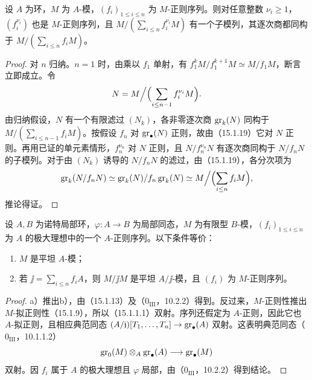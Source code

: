 设 $A$ 为环，$M$ 为 $A$-模，$(f_i)_{1\leq i\leq n}$ 为 $M$-正则序列。则对任意整数 $\nu_i\geq1$，$(f_i^{\nu_i})$ 也是 $M$-正则序列，且
$M/(\sum_{i\leq n}f_i^{\nu_i}M)$ 有一个子模列，其逐次商都同构于 $M/(\sum_{i\leq n}f_iM)$。
\begin{proof}
对 $n$ 归纳。$n=1$ 时，由乘以 $f_1$ 单射，有 $f_1^kM/f_1^{k+1}M\simeq M/f_1M$，断言立即成立。令
\[
 N=M\Big/\Bigl(\sum_{i\leq n-1}f_i^{\nu_i}M\Bigr).
\]
由归纳假设，$N$ 有一个有限滤过 $(N_k)$，各非零逐次商 $\operatorname{gr}_k(N)$ 同构于 $M/(\sum_{i\leq n-1}f_iM)$。按假设 $f_n$ 对 $\operatorname{gr}_\bullet(N)$ 正则，故由（15.1.19）它对 $N$ 正则。再用已证的单元素情形，$f_n^{\nu_n}$ 对 $N$ 正则，且 $N/f_n^{\nu_n}N$ 有逐次商同构于 $N/f_nN$ 的子模列。对于由 $(N_k)$ 诱导的 $N/f_nN$ 的滤过，由（15.1.19），各分次项为
\[
 \operatorname{gr}_k(N/f_nN)\simeq\operatorname{gr}_k(N)/f_n\operatorname{gr}_k(N)
 \simeq M\Big/\Bigl(\sum_{i\leq n}f_iM\Bigr),
\]
推论得证。
\end{proof}

设 $A,B$ 为诺特局部环，$\varphi:A\to B$ 为局部同态，$M$ 为有限型 $B$-模，$(f_i)_{1\leq i\leq n}$ 为 $A$ 的极大理想中的一个 $A$-正则序列。以下条件等价：
\begin{enumerate}[label=\alph*)]
\item $M$ 是平坦 $A$-模；
\item 若 $\jj=\sum_{i\leq n}f_iA$，则 $M/\jj M$ 是平坦 $A/\jj$-模，且 $(f_i)$ 为 $M$-正则序列。
\end{enumerate}
\begin{proof}
a）推出b），由（15.1.13）及（$0_{\mathrm{III}}$，10.2.2）得到。反过来，$M$-正则性推出 $M$-拟正则性（15.1.9），所以（15.1.1.1）双射。序列还假定为 $A$-正则，因此它也 $A$-拟正则，且相应典范同态
$(A/\mathfrak j)[T_1,\ldots,T_n]\to\operatorname{gr}_\bullet(A)$ 双射。这表明典范同态（$0_{\mathrm{III}}$，10.1.1.2）
\[
 \operatorname{gr}_0(M)\otimes_A\operatorname{gr}_\bullet(A)\longrightarrow\operatorname{gr}_\bullet(M)
\]
双射。因 $f_i$ 属于 $A$ 的极大理想且 $\varphi$ 局部，由（$0_{\mathrm{III}}$，10.2.2）得到结论。
\end{proof}

